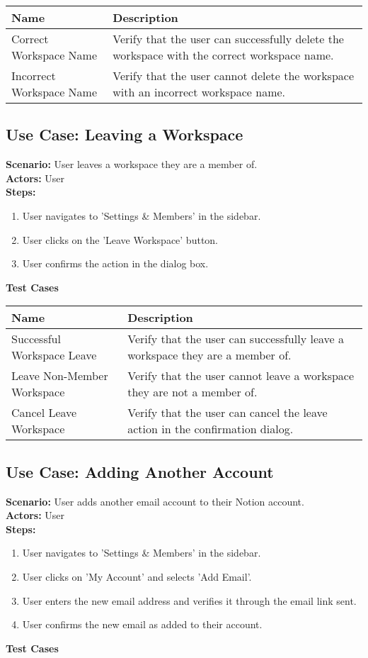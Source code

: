 \documentclass{article}
\begin{document}
            \begin{longtable}{|p{}|p{}|}
            \hline
            \textbf{Name} & \textbf{Description} \\
            \hline
            Correct Workspace Name & Verify that the user can successfully delete the workspace with the correct workspace name. \\
\hline
Incorrect Workspace Name & Verify that the user cannot delete the workspace with an incorrect workspace name. \\
\hline
\end{longtable}\subsection{\textbf{Use Case: Leaving a Workspace}}
\textbf{Scenario:} User leaves a workspace they are a member of.\\
\textbf{Actors:} User\\
\textbf{Steps:}
\begin{enumerate}
\item User navigates to 'Settings & Members' in the sidebar.
\item User clicks on the 'Leave Workspace' button.
\item User confirms the action in the dialog box.
\end{enumerate}
\textbf{Test Cases}

            \begin{longtable}{|p{}|p{}|}
            \hline
            \textbf{Name} & \textbf{Description} \\
            \hline
            Successful Workspace Leave & Verify that the user can successfully leave a workspace they are a member of. \\
\hline
Leave Non-Member Workspace & Verify that the user cannot leave a workspace they are not a member of. \\
\hline
Cancel Leave Workspace & Verify that the user can cancel the leave action in the confirmation dialog. \\
\hline
\end{longtable}\subsection{\textbf{Use Case: Adding Another Account}}
\textbf{Scenario:} User adds another email account to their Notion account.\\
\textbf{Actors:} User\\
\textbf{Steps:}
\begin{enumerate}
\item User navigates to 'Settings & Members' in the sidebar.
\item User clicks on 'My Account' and selects 'Add Email'.
\item User enters the new email address and verifies it through the email link sent.
\item User confirms the new email as added to their account.
\end{enumerate}
\textbf{Test Cases}
\end{document}
